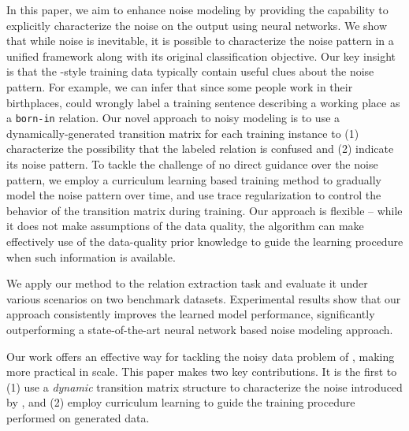 In this paper, we aim to enhance \DS noise modeling by providing the capability to explicitly characterize 
the noise on the \DS output using neural networks.  We show that while noise is inevitable, it is possible to characterize the noise pattern  in a unified framework along with its original classification objective. Our key insight is that the \DS-style training  data typically contain useful clues about the noise pattern. For example, we can infer that since some people work in their birthplaces, \DS could wrongly label a training sentence describing a working place as a \texttt{born-in} relation.
Our novel approach to noisy modeling is to use a dynamically-generated transition matrix for each training instance to (1) characterize the possibility that the \DS labeled relation is confused and (2) indicate its noise pattern.  To tackle the challenge of no direct guidance over the noise pattern, we employ a curriculum learning based training method to gradually model the noise pattern over time, and use trace regularization to control the behavior of the transition matrix during training. Our approach is flexible -- while it does not make assumptions of the data quality, the algorithm can make effectively use
of the data-quality prior knowledge to guide the learning procedure when such information is available. 

We apply our method to the relation extraction task and evaluate it under various scenarios on two benchmark datasets. Experimental results show
that our approach consistently improves the learned model performance, significantly outperforming a state-of-the-art neural network based
\DS noise modeling approach. 

Our work offers an effective way for tackling the noisy data problem of \DS, making \DS more practical in scale. This paper makes two key contributions. It is the first to (1) use a \emph{dynamic} transition matrix structure to characterize the noise introduced by \DS, and (2) employ curriculum learning to guide the training procedure performed on \DS generated data.


